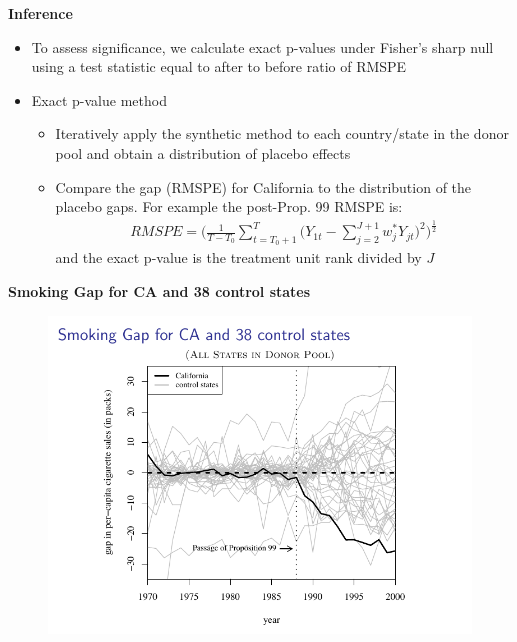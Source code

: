 \documentclass[notes=show]{beamer}
\begin{document}
\begin{frame}[plain]
	\begin{center}
	\textbf{Inference}
	\end{center}
	
	\begin{itemize}
	\item To assess significance, we calculate exact p-values under Fisher's sharp null using a test statistic equal to after to before ratio of RMSPE
	\item Exact p-value method
		\begin{itemize}
		\item Iteratively apply the synthetic method to each country/state in the donor pool and obtain a distribution of placebo effects
		\item Compare the gap (RMSPE) for California to the distribution of the placebo gaps. For example the post-Prop. 99 RMSPE is: 
			\begin{eqnarray*}
			RMSPE = \bigg(\frac{1}{T-T_0} \sum_{t=T_0+1}^T \bigg(Y_{1t} - \sum_{j=2}^{J+1} w_j^* Y_{jt}\bigg)^2 \bigg)^{\frac{1}{2}}
			\end{eqnarray*}and the exact p-value is the treatment unit rank divided by $J$
		\end{itemize}
	\end{itemize}
\end{frame}

\begin{frame}[plain]
	\begin{center}
	\textbf{Smoking Gap for CA and 38 control states}
	\end{center}
	
	\begin{figure}
	\includegraphics[scale=0.75]{./lecture_includes/abadie_7.pdf}
	\end{figure}
\end{frame}
\end{document}
